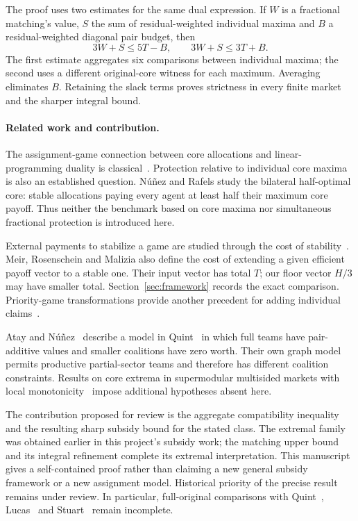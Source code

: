\documentclass[11pt]{article}
\theoremstyle{remark}
\begin{document}
The proof uses two estimates for the same dual expression. If $W$ is a
fractional matching's value, $S$ the sum of residual-weighted individual
maxima and $B$ a residual-weighted diagonal pair budget, then
\[
                 3W+S\le5T-B,
        \qquad   3W+S\le3T+B.
\]
The first estimate aggregates six comparisons between individual maxima;
the second uses a different original-core witness for each maximum.
Averaging eliminates $B$. Retaining the slack terms proves strictness in
every finite market and the sharper integral bound.

\paragraph{Related work and contribution.}
The assignment-game connection between core allocations and linear-programming
duality is classical~\cite{ShapleyShubik1971}. Protection relative to individual
core maxima is also an established question. N\'u\~nez and Rafels
\cite[Definition~6]{NunezRafels2004} study the bilateral half-optimal core:
stable allocations paying every agent at least half their maximum core
payoff. Thus neither the benchmark based on core maxima nor simultaneous
fractional protection is introduced here.

External payments to stabilize a game are studied through the cost of
stability~\cite{Bachrach2009}. Meir, Rosenschein and Malizia
\cite[Section~2.2]{Meir2011} also define the cost of extending a given
efficient payoff vector to a stable one. Their input vector has total $T$;
our floor vector $H/3$ may have smaller total. Section~\ref{sec:framework}
records the exact comparison. Priority-game transformations provide another
precedent for adding individual claims~\cite{Priority2024}.

Atay and N\'u\~nez~\cite[p.~273]{AtayNunez2019} describe a model in
Quint~\cite{Quint1991} in which full teams have pair-additive values and
smaller coalitions have zero worth. Their own graph model permits productive
partial-sector teams and therefore has different coalition constraints.
Results on core extrema in supermodular multisided markets with local
monotonicity~\cite{Martinez2026} impose additional hypotheses absent here.

The contribution proposed for review is the aggregate compatibility
inequality and the resulting sharp subsidy bound for the stated class.
The extremal family was obtained earlier in this project's subsidy work;
the matching upper bound and its integral refinement complete its extremal
interpretation. This manuscript gives a self-contained proof rather than
claiming a new general subsidy framework or a new assignment model.
Historical priority of the precise result remains under review. In
particular, full-original comparisons with Quint~\cite{Quint1991},
Lucas~\cite{Lucas1995} and Stuart~\cite{Stuart1997} remain incomplete.
\end{document}
